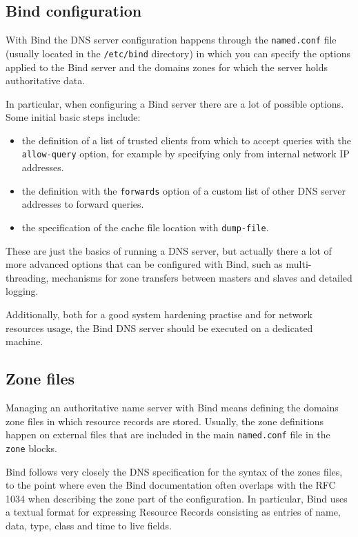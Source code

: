 \documentclass[11pt,a4paper]{article}
\begin{document}
\subsection{Bind configuration}

With Bind the DNS server configuration happens through the \texttt{named.conf} file (usually located in the \texttt{/etc/bind} directory) in which you can specify the options applied to the Bind server and the domains zones for which the server holds authoritative data.

\noindent
In particular, when configuring a Bind server there are a lot of possible options. Some initial basic steps include:
\begin{itemize}
\item the definition of a list of trusted clients from which to accept queries with the \texttt{allow-query} option, for example by specifying only from internal network IP addresses. 
\item the definition with the \texttt{forwards} option of a custom list of other DNS server addresses to forward queries.
\item the specification of the cache file location with \texttt{dump-file}. 
\end{itemize}
These are just the basics of running a DNS server, but actually there a lot of more advanced options that can be configured with Bind, such as multi-threading, mechanisms for zone transfers between masters and slaves and detailed logging.

\noindent
Additionally, both for a good system hardening practise and for network resources usage, the Bind DNS server should be executed on a dedicated machine.

\subsection{Zone files}

Managing an authoritative name server with Bind means defining the domains zone files in which resource records are stored. Usually, the zone definitions happen on external files that are included in the main \texttt{named.conf} file in the \texttt{zone} blocks. 

\noindent
Bind follows very closely the DNS specification for the syntax of the zones files, to the point where even the Bind documentation often overlaps with the RFC 1034 when describing the zone part of the configuration. In particular, Bind uses a textual format for expressing Resource Records consisting as entries of name, data, type, class and time to live fields.
\end{document}

